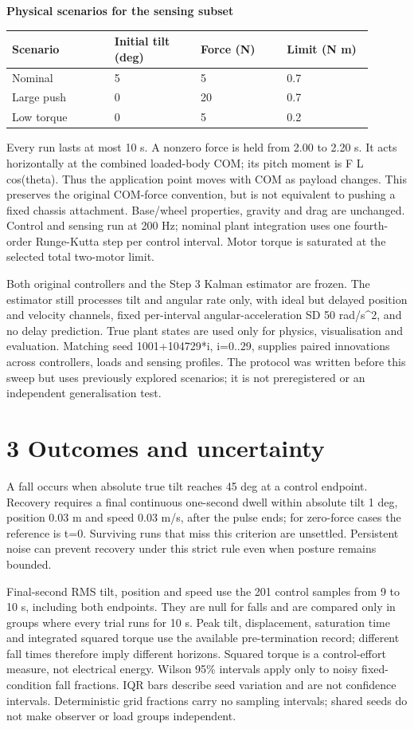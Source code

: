 \documentclass[11pt,a4paper]{article}
\begin{document}
\textbf{Physical scenarios for the sensing subset}
\begin{longtable}{p{0.252\linewidth}p{0.216\linewidth}p{0.216\linewidth}p{0.216\linewidth}}
\toprule
Scenario & Initial tilt (deg) & Force (N) & Limit (N m) \\ \midrule \endhead
Nominal & 5 & 5 & 0.7 \\
Large push & 0 & 20 & 0.7 \\
Low torque & 0 & 5 & 0.2 \\
\bottomrule
\end{longtable}
Every run lasts at most 10 s. A nonzero force is held from 2.00 to 2.20 s. It acts horizontally at the combined loaded-body COM; its pitch moment is F L cos(theta). Thus the application point moves with COM as payload changes. This preserves the original COM-force convention, but is not equivalent to pushing a fixed chassis attachment. Base/wheel properties, gravity and drag are unchanged. Control and sensing run at 200 Hz; nominal plant integration uses one fourth-order Runge-Kutta step per control interval. Motor torque is saturated at the selected total two-motor limit.

Both original controllers and the Step 3 Kalman estimator are frozen. The estimator still processes tilt and angular rate only, with ideal but delayed position and velocity channels, fixed per-interval angular-acceleration SD 50 rad/s\textasciicircum{}2, and no delay prediction. True plant states are used only for physics, visualisation and evaluation. Matching seed 1001+104729*i, i=0..29, supplies paired innovations across controllers, loads and sensing profiles. The protocol was written before this sweep but uses previously explored scenarios; it is not preregistered or an independent generalisation test.

\section*{3 Outcomes and uncertainty}
A fall occurs when absolute true tilt reaches 45 deg at a control endpoint. Recovery requires a final continuous one-second dwell within absolute tilt 1 deg, position 0.03 m and speed 0.03 m/s, after the pulse ends; for zero-force cases the reference is t=0. Surviving runs that miss this criterion are unsettled. Persistent noise can prevent recovery under this strict rule even when posture remains bounded.

Final-second RMS tilt, position and speed use the 201 control samples from 9 to 10 s, including both endpoints. They are null for falls and are compared only in groups where every trial runs for 10 s. Peak tilt, displacement, saturation time and integrated squared torque use the available pre-termination record; different fall times therefore imply different horizons. Squared torque is a control-effort measure, not electrical energy. Wilson 95\% intervals apply only to noisy fixed-condition fall fractions. IQR bars describe seed variation and are not confidence intervals. Deterministic grid fractions carry no sampling intervals; shared seeds do not make observer or load groups independent.
\end{document}
